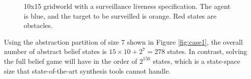 \begin{figure}
\hfill
{}

\caption{10x15 gridworld with a surveillance liveness specification. The agent is blue, and the target to be surveilled is orange. Red states are obstacles.}
\label{fig:casestudies}

\end{figure}



Using the abstraction partition of size 7 shown in Figure \ref{fig:case1}, the overall number of abstract belief states is $15\times10 + 2^7 = 278$ states. In contrast, solving the full belief game will have in the order of $2^{150}$ states, which is a state-space size that state-of-the-art synthesis tools cannot handle. 

